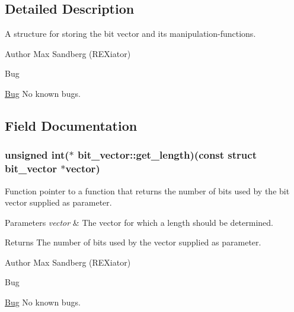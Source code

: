 \subsection{\-Detailed \-Description}
\-A structure for storing the bit vector and its manipulation-\/functions. 

\begin{DoxyAuthor}{\-Author}
\-Max \-Sandberg (\-R\-E\-Xiator) 
\end{DoxyAuthor}
\begin{DoxyRefDesc}{\-Bug}
\item[\hyperlink{bug__bug000107}{\-Bug}]\-No known bugs. \end{DoxyRefDesc}


\subsection{\-Field \-Documentation}
\hypertarget{structbit__vector_a4dd635a7181b451d8a708d152202a9f9}{
\subsubsection[{get\-\_\-length}]{\setlength{\rightskip}{0pt plus 5cm}unsigned int($\ast$ {\bf bit\-\_\-vector\-::get\-\_\-length})(const struct {\bf bit\-\_\-vector} $\ast$vector)}}\label{structbit__vector_a4dd635a7181b451d8a708d152202a9f9}


\-Function pointer to a function that returns the number of bits used by the bit vector supplied as parameter. 


\begin{DoxyParams}{\-Parameters}
{\em vector} & \-The vector for which a length should be determined. \\
\hline
\end{DoxyParams}
\begin{DoxyReturn}{\-Returns}
\-The number of bits used by the vector supplied as parameter. 
\end{DoxyReturn}
\begin{DoxyAuthor}{\-Author}
\-Max \-Sandberg (\-R\-E\-Xiator) 
\end{DoxyAuthor}
\begin{DoxyRefDesc}{\-Bug}
\item[\hyperlink{bug__bug000114}{\-Bug}]\-No known bugs. \end{DoxyRefDesc}



